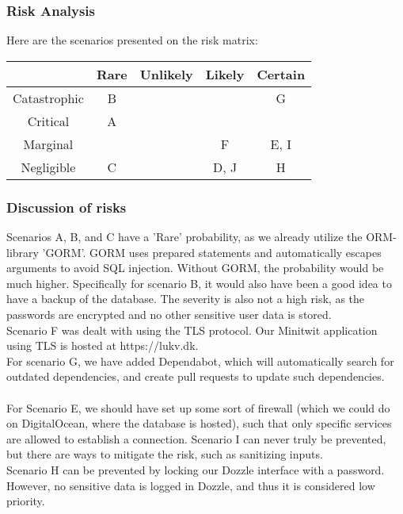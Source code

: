 \subsubsection{Risk Analysis}
Here are the scenarios presented on the risk matrix:
\begin{center}
\begin{tabular}{ |c|c|c|c|c| } 
 \hline
  & Rare & Unlikely & Likely & Certain \\ 
 \hline
 Catastrophic & B &  &  & G\\ 
 \hline
 Critical & A &  &  & \\ 
 \hline
 Marginal & &  &  F& E, I\\ 
 \hline
 Negligible & C &  & D, J & H\\ 
 \hline
\end{tabular}
\end{center}
\subsubsection{Discussion of risks}
Scenarios A, B, and C have a 'Rare' probability, as we already utilize the ORM-library 'GORM'. GORM uses prepared statements and automatically escapes arguments to avoid SQL injection. Without GORM, the probability would be much higher. Specifically for scenario B, it would also have been a good idea to have a backup of the database. The severity is also not a high risk, as the passwords are encrypted and no other sensitive user data is stored.\\
Scenario F was dealt with using the TLS protocol. Our Minitwit application using TLS is hosted at https://lukv.dk.\\
For scenario G, we have added Dependabot, which will automatically search for outdated dependencies, and create pull requests to update such dependencies.
\\\\
For Scenario E, we should have set up some sort of firewall (which we could do on DigitalOcean, where the database is hosted), such that only specific services are allowed to establish a connection. 
Scenario I can never truly be prevented, but there are ways to mitigate the risk, such as sanitizing inputs. 
\\
Scenario H can be prevented by locking our Dozzle interface with a password. However, no sensitive data is logged in Dozzle, and thus it is considered low priority.
